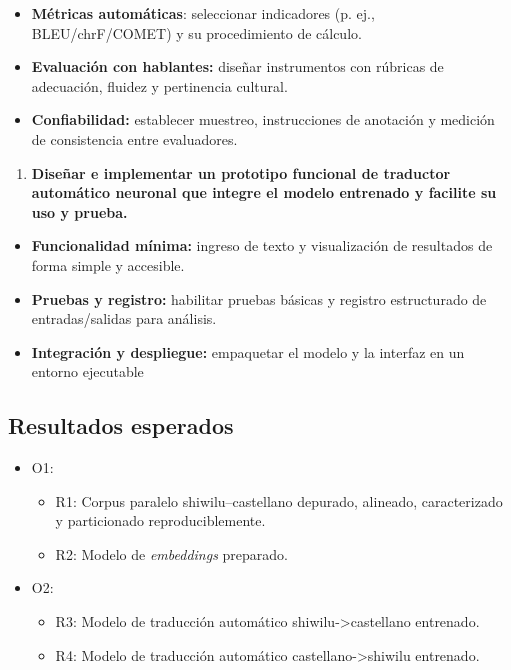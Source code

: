 \documentclass[12pt,a4paper,oneside]{book}
\begin{document}
\begin{itemize}
\item
  \textbf{Métricas automáticas}: seleccionar indicadores (p. ej., BLEU/chrF/COMET) y su procedimiento de cálculo.
\item
  \textbf{Evaluación con hablantes:} diseñar instrumentos con rúbricas de adecuación, fluidez y pertinencia cultural.
\item
  \textbf{Confiabilidad:} establecer muestreo, instrucciones de anotación y medición de consistencia entre evaluadores.
\end{itemize}

\begin{enumerate}
\def\labelenumi{\arabic{enumi}.}
\setcounter{enumi}{3}
\item
  \textbf{Diseñar e implementar un prototipo funcional de traductor automático neuronal que integre el modelo entrenado y facilite su uso y prueba.}
\end{enumerate}

\begin{itemize}
\item
  \textbf{Funcionalidad mínima:} ingreso de texto y visualización de resultados de forma simple y accesible.
\item
  \textbf{Pruebas y registro:} habilitar pruebas básicas y registro estructurado de entradas/salidas para análisis.
\item
  \textbf{Integración y despliegue:} empaquetar el modelo y la interfaz en un entorno ejecutable
\end{itemize}

\subsection{Resultados esperados}\label{resultados-esperados}

\begin{itemize}
\item
  O1:

  \begin{itemize}
  \item
    R1: Corpus paralelo shiwilu--castellano depurado, alineado, caracterizado y particionado reproduciblemente.
  \item
    R2: Modelo de \emph{embeddings} preparado.
  \end{itemize}
\item
  O2:

  \begin{itemize}
  \item
    R3: Modelo de traducción automático shiwilu-\textgreater castellano entrenado.
  \item
    R4: Modelo de traducción automático castellano-\textgreater shiwilu entrenado.
  \end{itemize}
\end{itemize}
\end{document}
